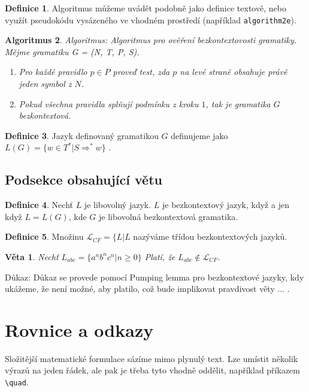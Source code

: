 \documentclass[11pt]{article}
\theoremstyle{definition}
\newtheorem{def1}{Definice}[section]
\theoremstyle{plain}
\newtheorem{def2}[def1]{Algoritmus}
\newtheorem{def3}{Věta}
\begin{document}
\begin{multicols*}{2}
\begin{def1}
		Algoritmus můžeme uvádět podobně jako definice textově, nebo využít pseudokódu vysázeného ve vhodném prostředí (například \texttt{algorithm2e}).
	\end{def1}	

	\begin{def2}Algoritmus: Algoritmus pro ověření bezkontextovosti gramatiky. Mějme gramatiku G = (N, T, P, S).
	\begin{enumerate}
		\item Pro každé pravidlo $p \in P$ proveď test, zda $p$ na levé straně obsahuje právě jeden symbol z $N$.
		\item Pokud všechna pravidla splňují podmínku z kroku $1$, tak je gramatika $G$ bezkontextová.
	\end{enumerate}
	\end{def2}


	\begin{def1}
		Jazyk definovaný gramatikou $G$ definujeme jako $L(G) = \{ w \in T^* | S \Rightarrow^* w\}$ .
	\end{def1}

	\subsection{Podsekce obsahující větu}
	\begin{def1}
	 	Nechť $L$ je libovolný jazyk. $L$ je bezkontextový jazyk, když a jen když $L = L(G)$, kde $G$ je libovolná bezkontextová gramatika.
	\end{def1}
	
	\begin{def1}
		Množinu $\mathcal{L}_{CF} = \{L|L$ nazýváme třídou bezkontextových jazyků.
	\end{def1}
	
	\begin{def3}
		Nechť $L_{abc} = \{a^n b^n c^n | n \geq 0\}$ Platí, že $L_{abc} \notin \mathcal{L}_{CF}$.
	\end{def3}
	
Důkaz: Důkaz se provede pomocí Pumping lemma pro bezkontextové jazyky, kdy ukážeme, že není možné, aby platilo, což bude implikovat pravdivost věty ... .





	\section{Rovnice a odkazy}

Složitější matematické formulace sázíme mimo plynulý text. Lze umístit několik výrazů na jeden řádek, ale pak je třeba tyto vhodně oddělit, například příkazem \verb|\quad|. 


\end{multicols*}
\end{document}
